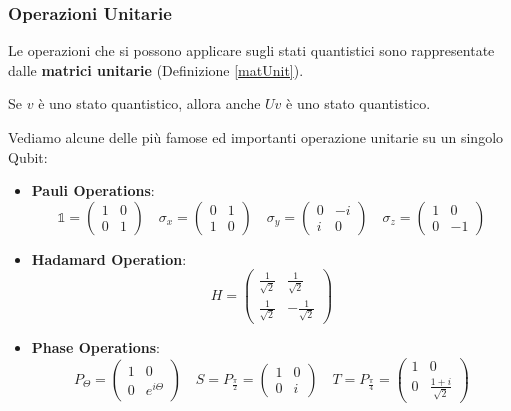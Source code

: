 \subsubsection{Operazioni Unitarie}
Le operazioni che si possono applicare sugli stati quantistici sono rappresentate dalle \textbf{matrici unitarie} (Definizione \ref{matUnit}).
\begin{oss}{}{}
    Se $v$ è uno stato quantistico, allora anche $Uv$ è uno stato quantistico.
\end{oss}
Vediamo alcune delle più famose ed importanti operazione unitarie su un singolo Qubit:
\begin{itemize}
    \item \textbf{Pauli Operations}:
    \begin{equation*}
        \mathbb{1} = \left(\begin{array}{cc}
            1 & 0 \\
            0 & 1
        \end{array}\right)
        \quad
        \sigma_x = \left(\begin{array}{cc}
            0 & 1 \\
            1 & 0
        \end{array}\right)
        \quad
        \sigma_y = \left(\begin{array}{cc}
            0 & -i \\
            i & 0
        \end{array}\right)
        \quad
        \sigma_z = \left(\begin{array}{cc}
            1 & 0 \\
            0 & -1
        \end{array}\right)
    \end{equation*}
    \item \textbf{Hadamard Operation}:
    \begin{equation*}
        H = \left(\begin{array}{cc}
            \frac{1}{\sqrt{2}} & \frac{1}{\sqrt{2}} \\
            \frac{1}{\sqrt{2}} & -\frac{1}{\sqrt{2}}
        \end{array}\right)
    \end{equation*}
    \item \textbf{Phase Operations}:
    \begin{equation*}
        P_{\Theta} = \left(\begin{array}{cc}
            1 & 0 \\
            0 & e^{i\Theta}
        \end{array}\right)
        \quad
        S = P_{\frac{\pi}{2}} =\left(\begin{array}{cc}
            1 & 0 \\
            0 & i
        \end{array}\right)
        \quad
        T = P_{\frac{\pi}{4}} =\left(\begin{array}{cc}
            1 & 0 \\
            0 & \frac{1+i}{\sqrt{2}}
        \end{array}\right)
    \end{equation*}
\end{itemize}

